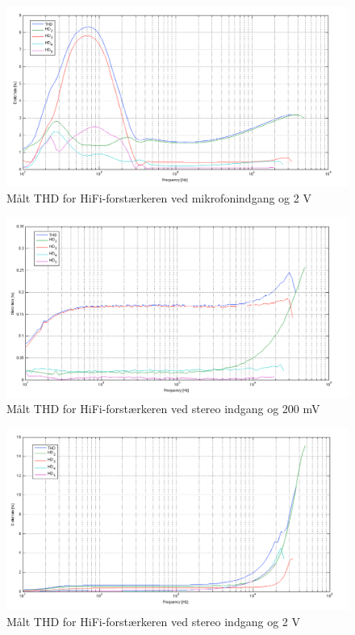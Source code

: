 \begin{figure}[h]
\centering
\includegraphics[width=\textwidth]{maalerapporter/final/mic/final_mic_31,6mv_thd.png}
\caption{Målt THD for HiFi-forstærkeren ved mikrofonindgang og 2 V}
\label{maalerapport_final2}
\end{figure}

\begin{figure}[h]
\centering
\includegraphics[width=\textwidth]{maalerapporter/final/stereo/final_stereo_200mv_thd.png}
\caption{Målt THD for HiFi-forstærkeren ved stereo indgang og 200 mV}
\label{maalerapport_final3}
\end{figure}

\begin{figure}[h]
\centering
\includegraphics[width=\textwidth]{maalerapporter/final/stereo/final_stereo_2v_thd.png}
\caption{Målt THD for HiFi-forstærkeren ved stereo indgang og 2 V}
\label{maalerapport_final4}
\end{figure}

